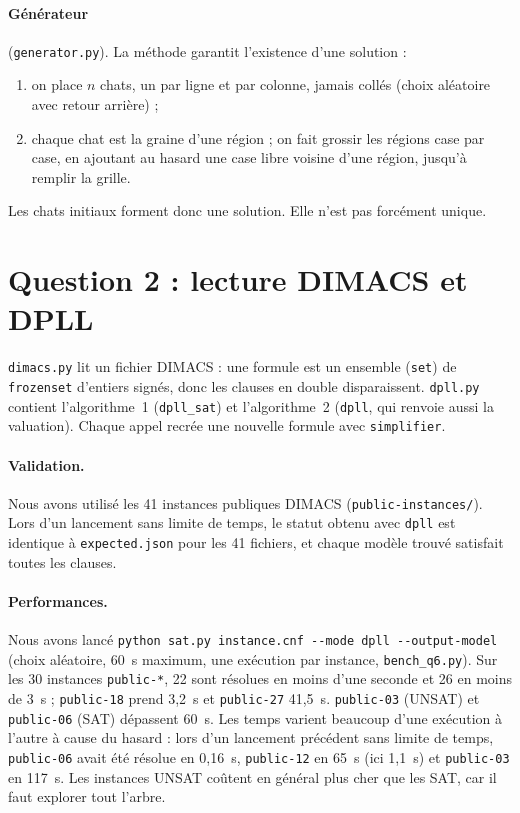 \documentclass[11pt,a4paper]{article}
\newcommand{\f}[1]{\texttt{#1}}
\begin{document}
\paragraph{Générateur} (\f{generator.py}). La méthode garantit l'existence d'une solution :
\begin{enumerate}
  \item on place $n$ chats, un par ligne et par colonne, jamais collés (choix aléatoire avec retour arrière) ;
  \item chaque chat est la graine d'une région ; on fait grossir les régions case par case, en ajoutant au hasard une case libre voisine d'une région, jusqu'à remplir la grille.
\end{enumerate}
Les chats initiaux forment donc une solution. Elle n'est pas forcément unique.

\section*{Question 2 : lecture DIMACS et DPLL}

\f{dimacs.py} lit un fichier DIMACS : une formule est un ensemble (\f{set}) de \f{frozenset} d'entiers signés, donc les clauses en double disparaissent. \f{dpll.py} contient l'algorithme~1 (\f{dpll\_sat}) et l'algorithme~2 (\f{dpll}, qui renvoie aussi la valuation). Chaque appel recrée une nouvelle formule avec \f{simplifier}.

\paragraph{Validation.} Nous avons utilisé les 41 instances publiques DIMACS (\f{public-instances/}). Lors d'un lancement sans limite de temps, le statut obtenu avec \f{dpll} est identique à \f{expected.json} pour les 41 fichiers, et chaque modèle trouvé satisfait toutes les clauses.

\paragraph{Performances.} Nous avons lancé \f{python sat.py instance.cnf -{}-mode dpll -{}-output-model} (choix aléatoire, 60~s maximum, une exécution par instance, \f{bench\_q6.py}). Sur les 30 instances \f{public-*}, 22 sont résolues en moins d'une seconde et 26 en moins de 3~s ; \f{public-18} prend 3,2~s et \f{public-27} 41,5~s. \f{public-03} (UNSAT) et \f{public-06} (SAT) dépassent 60~s. Les temps varient beaucoup d'une exécution à l'autre à cause du hasard : lors d'un lancement précédent sans limite de temps, \f{public-06} avait été résolue en 0,16~s, \f{public-12} en 65~s (ici 1,1~s) et \f{public-03} en 117~s. Les instances UNSAT coûtent en général plus cher que les SAT, car il faut explorer tout l'arbre.
\end{document}
